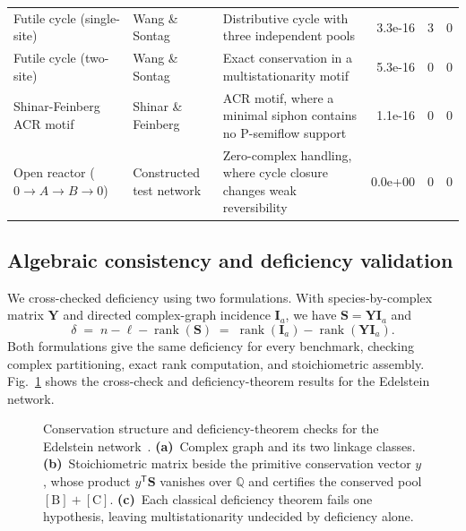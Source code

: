 \documentclass[10pt,a4paper,fleqn]{article}
\theoremstyle{plain}\newtheorem{theorem}{Theorem}
\begin{document}
\begin{table}[htbp]
\begin{tabularx}{\linewidth}{@{}>{\raggedright\arraybackslash}p{3.15cm}>{\raggedright\arraybackslash}p{2.85cm}Xrrr@{}}
Futile cycle (single-site) & Wang \& Sontag~\cite{wang2008multisite} & Distributive cycle with three independent pools & 3.3e-16 & 3 & 0 \\
Futile cycle (two-site) & Wang \& Sontag~\cite{wang2008multisite} & Exact conservation in a multistationarity motif & 5.3e-16 & 0 & 0 \\
Shinar-Feinberg ACR motif & Shinar \& Feinberg~\cite{shinar2010structural} & ACR motif, where a minimal siphon contains no P-semiflow support & 1.1e-16 & 0 & 0 \\
Open reactor ($0 \to A \to B \to 0$) & Constructed test network & Zero-complex handling, where cycle closure changes weak reversibility & 0.0e+00 & 0 & 0 \\
\bottomrule
\end{tabularx}
\end{table}

\subsection{Algebraic consistency and deficiency validation}

We cross-checked deficiency using two formulations. With species-by-complex matrix $\mathbf Y$ and directed complex-graph incidence $\mathbf I_a$, we have $\mathbf S = \mathbf Y\mathbf I_a$ and
\begin{equation}
\label{eq:deficiency_crosscheck}
\delta \;=\; n-\ell-\operatorname{rank}(\mathbf S)
\;=\; \operatorname{rank}(\mathbf I_a)-\operatorname{rank}(\mathbf Y\mathbf I_a).
\end{equation}
Both formulations give the same deficiency for every benchmark, checking complex partitioning, exact rank computation, and stoichiometric assembly. Fig.~\ref{fig:deficiency} shows the cross-check and deficiency-theorem results for the Edelstein network.

\begin{figure}[!htbp]
    \centering
    
    \caption{Conservation structure and deficiency-theorem checks for the Edelstein network~\cite{edelstein1970biochemical}. \textbf{(a)}~Complex graph and its two linkage classes. \textbf{(b)}~Stoichiometric matrix beside the primitive conservation vector $y$, whose product $y^{\mathsf T}\mathbf S$ vanishes over $\mathbb Q$ and certifies the conserved pool $[\mathrm B]+[\mathrm C]$. \textbf{(c)}~Each classical deficiency theorem fails one hypothesis, leaving multistationarity undecided by deficiency alone.}
    \label{fig:deficiency}
\end{figure}
\end{document}
